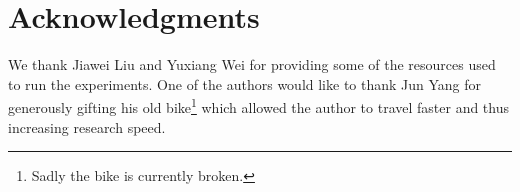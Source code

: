 \section*{Acknowledgments}

We thank Jiawei Liu and Yuxiang Wei for providing some of the{ resources} used to run the experiments. One of the authors would like to thank Jun Yang for generously gifting his old bike\footnote{Sadly the bike is currently broken.} which allowed the author to travel faster and thus increasing research speed. 


